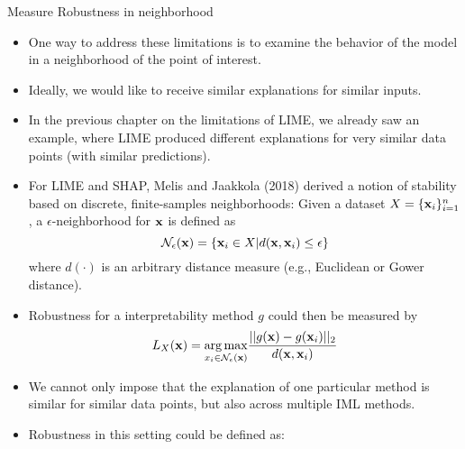 \documentclass[11pt,compress,t,notes=noshow, xcolor=table]{beamer}
\begin{document}
\begin{vbframe}{Measure Robustness in neighborhood}
	\begin{itemize}
		\item One way to address these limitations is to examine the behavior of the model in a neighborhood of the point of interest. 
		\item Ideally, we would like to receive similar explanations for similar inputs. 
		\item In the previous chapter on the limitations of LIME, we already saw an example, where LIME produced different explanations for very similar data points (with similar predictions).
		\item For LIME and SHAP, Melis and Jaakkola (2018) derived a notion of stability based on discrete, finite-samples neighborhoods: 
		Given a dataset $X = \{\xv_i\}_{i = 1}^n$, a $\epsilon$-neighborhood for $\xv$ is defined as 
		$$ \mathcal{N}_{\epsilon}(\xv) = \{\xv_i \in X | d(\xv, \xv_i) \le \epsilon\}$$
		where $d(\cdot)$ is an  arbitrary distance measure (e.g., Euclidean or Gower distance). 
		\item Robustness for a interpretability method $g$ could then be measured by 
		$$L_{X}(\xv) = \underset{x_i \in \mathcal{N}_{\epsilon}(\xv)}{\arg \max} \frac{||g(\xv) - g(\xv_i)||_2}{d(\xv, \xv_i)}$$
		\item We cannot only impose that the explanation of one particular method is similar for similar data points, but also across multiple IML methods. 
		\item Robustness in this setting could be defined as: 
		
	\end{itemize}
\end{vbframe}

\begin{comment}
\begin{vbframe}{Robustness}
	\begin{itemize}
		\item Robustness in vicinity of data point \url{https://arxiv.org/pdf/1806.08049.pdf} (LIME and SHAP)
		\item Robustness if we repeatedly explain prediction of a data point 
		\item Levels: different seed, different permutation/bootstrap samples (only makes sense if training data is involved), different model fits (process` variance)
	\end{itemize}
\end{vbframe}
\end{comment}
\end{document}
